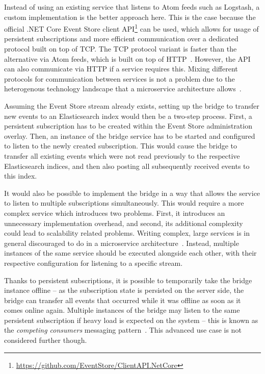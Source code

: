 Instead of using an existing service that listens to Atom feeds such as Logstash, a custom implementation is the better approach here.
This is the case because the official .NET Core Event Store client \ac{API}\footnote{\url{https://github.com/EventStore/ClientAPI.NetCore}} can be used, which allows for usage of persistent subscriptions and more efficient communication over a dedicated protocol built on top of \ac{TCP}.
The \ac{TCP} protocol variant is faster than the alternative via Atom feeds, which is built on top of \ac{HTTP}~\cite{WEB:EvtSt-Which-Api}.
However, the \ac{API} can also communicate via \ac{HTTP} if a service requires this.
Mixing different protocols for communication between services is not a problem due to the heterogenous technology landscape that a microservice architecture allows~\cite[Key Benefits,pp.~4f]{newman2015building}.


Assuming the Event Store stream already exists, setting up the bridge to transfer new events to an Elasticsearch index would then be a two-step process.
First, a persistent subscription has to be created within the Event Store administration overlay.
Then, an instance of the bridge service has to be started and configured to listen to the newly created subscription.
This would cause the bridge to transfer all existing events which were not read previously to the respective Elasticsearch indices, and then also posting all subsequently received events to this index.

It would also be possible to implement the bridge in a way that allows the service to listen to multiple subscriptions simultaneously.
This would require a more complex service which introduces two problems.
First, it introduces an unnecessary implementation overhead, and second, its additional complexity could lead to scalability related problems.
Writing complex, large services is in general discouraged to do in a microservice architecture~\cite[Key Benefits,pp.~5f]{newman2015building}.
Instead, multiple instances of the same service should be executed alongside each other, with their respective configuration for listening to a specific stream.

Thanks to persistent subscriptions, it is possible to temporarily take the bridge instance offline -- as the subscription state is persisted on the server side, the bridge can transfer all events that occurred while it was offline as soon as it comes online again.
Multiple instances of the bridge may listen to the same persistent subscription if heavy load is expected on the system -- this is known as the \emph{competing consumers} messaging pattern~\cite{WEB:Microsoft-Competing-Consumers}.
This advanced use case is not considered further though.

